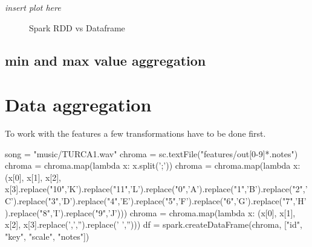 \textit{insert plot here}
\begin{figure}[htbp]
	\centering
	\caption{Spark RDD vs Dataframe}
	\label{fig:spark1}
\end{figure}

\subsection{min and max value aggregation}

\section{Data aggregation}

To work with the features a few transformations have to be done first. 

\begin{pythonCode}
song = "music/TURCA1.wav"
chroma = sc.textFile("features/out[0-9]*.notes")
chroma = chroma.map(lambda x: x.split(';'))
chroma = chroma.map(lambda x: (x[0], x[1], x[2], x[3].replace("10",'K').replace("11",'L').replace("0",'A').replace("1",'B').replace("2",'C').replace("3",'D').replace("4",'E').replace("5",'F').replace("6",'G').replace("7",'H').replace("8",'I').replace("9",'J')))
chroma = chroma.map(lambda x: (x[0], x[1], x[2], x[3].replace(',','').replace(' ','')))
df = spark.createDataFrame(chroma, ["id", "key", "scale", "notes"])
\end{pythonCode}

